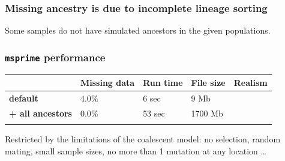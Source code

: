 \documentclass[11pt, mathserif, aspectratio=169]{beamer}
\newcommand{\crossmark}{\ding{55}}
\newenvironment{wideitemize}{\itemize\addtolength{\itemsep}{10pt}}{\enditemize}
\begin{document}
\begin{frame}
\frametitle{Missing ancestry is due to incomplete lineage sorting}
\begin{center}

\end{center}
Some samples do not have simulated ancestors in the given populations.
\end{frame}

\begin{frame}
\frametitle{\texttt{msprime} performance}
\begin{center}
\small
\centering
\setlength{\aboverulesep}{5pt}
\setlength{\belowrulesep}{5pt}
\begin{tabularx}{1\textwidth}{p{3.5cm}p{2cm}p{1.9cm}p{1.9cm}X}
\toprule
 & Missing data & Run time & File size & Realism \\
\midrule 
{\bf default} & $4.0$\% & 6 sec &  9 Mb & \crossmark \\ \addlinespace
{\bf + all ancestors} & $0.0$\% & 53 sec  &  1700 Mb & \crossmark \\ \addlinespace
\bottomrule
\end{tabularx}
\end{center}
\vspace{5mm}
Restricted by the limitations of the coalescent model: no selection, random mating, small sample sizes, no more than 1 mutation at any location \ldots
\end{frame}

\end{document}

